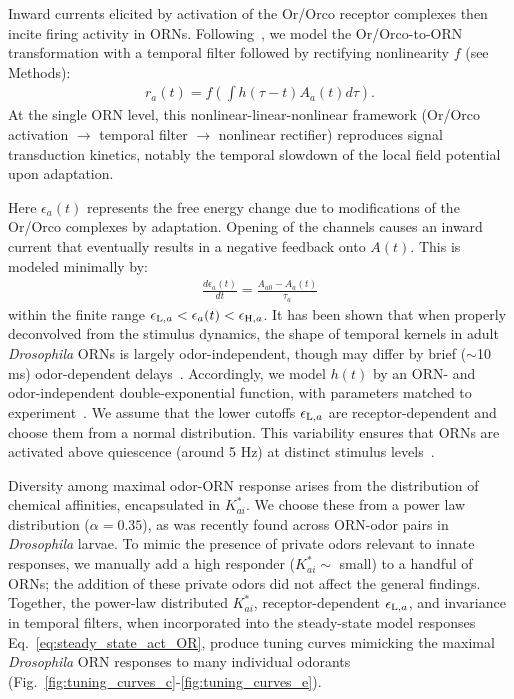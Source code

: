 Inward currents elicited by activation of the Or/Orco receptor complexes then incite firing activity in ORNs. Following~\cite{srinivas_elife}, we model the Or/Orco-to-ORN transformation with a temporal filter followed by rectifying nonlinearity $f$ (see Methods):
\begin{align}
r_a(t) = f\left(\int h(\tau - t)A_a(t) d\tau\right).
\label{eq:steady_state_firing}
\end{align}
At the single ORN level, this nonlinear-linear-nonlinear framework (Or/Orco activation $\rightarrow$ temporal filter $\rightarrow$ nonlinear rectifier) reproduces signal transduction kinetics, notably the temporal slowdown of the local field potential upon adaptation. 





Here $\epsilon_a(t)$ represents the free energy change due to modifications of the Or/Orco complexes by adaptation. Opening of the channels causes an inward current that eventually results in a negative feedback onto $A(t)$. This is modeled minimally by:
\begin{align}
\frac{d\epsilon_a(t)}{dt} = \frac{{A}_{a0} - A_a(t)}{\tau_a}
\label{eq:adaptation_dynamics}
\end{align}
within the finite range $\epsilon_{\textup{L}, a} < \epsilon_a(t) < \epsilon_{\textup{H}, a}$. It has been shown that when properly deconvolved from the stimulus dynamics, the shape of temporal kernels in adult \textit{Drosophila} ORNs is largely odor-independent, though may differ by brief ($\sim$10 ms) odor-dependent delays~\cite{martelli}. Accordingly, we model $h(t)$ by an ORN- and odor-independent double-exponential function, with parameters matched to experiment~\cite{martelli}. We assume that the lower cutoffs $\epsilon_{\textup{L}, a}$ are receptor-dependent and choose them from a normal distribution. This variability ensures that ORNs are activated above quiescence (around 5 Hz) at distinct stimulus levels~\cite{srinivas_elife}.  %


Diversity among maximal odor-ORN response arises from the distribution of chemical affinities, encapsulated in $K^*_{ai}$. We choose these from a power law distribution ($\alpha = 0.35$), as was recently found across ORN-odor pairs in \textit{Drosophila} larvae. To mimic the presence of private odors relevant to innate responses, we manually add a high responder ($K^*_{ai} \sim $ small)  to a handful of ORNs; the addition of these private odors did not affect the general findings. Together, the power-law distributed $K^*_{ai}$, receptor-dependent $\epsilon_{\textup{L}, a}$, and invariance in temporal filters, when incorporated into the steady-state model responses Eq.~\ref{eq:steady_state_act_OR}, produce tuning curves mimicking the maximal \textit{Drosophila} ORN responses to many individual odorants~\cite{hallem_carlson} (Fig.~\ref{fig:tuning_curves_c}-\ref{fig:tuning_curves_e}). 



